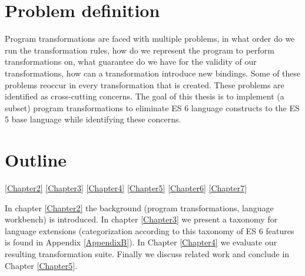 \section{Problem definition}
Program transformations are faced with multiple problems, in what order do we run the transformation rules, how do we represent the program to perform transformations on, what guarantee do we have for the validity of our transformations, how can a transformation introduce new bindings.
Some of these problems reoccur in every transformation that is created. These problems are identified as cross-cutting concerns. The goal of this thesis is to implement (a subset) program transformations to eliminate ES 6 language constructs to the ES 5 base language while identifying these concerns.

\section{Outline}
\ref{Chapter2}
\ref{Chapter3}
\ref{Chapter4}
\ref{Chapter5}
\ref{Chapter6}
\ref{Chapter7}

In chapter \ref{Chapter2} the background (program transformations, language workbench) is introduced. In chapter \ref{Chapter3} we present a taxonomy for language extensions (categorization according to this taxonomy of ES 6 features is found in Appendix \ref{AppendixB}). In Chapter \ref{Chapter4} we evaluate our resulting transformation suite. Finally we discuss related work and conclude in Chapter \ref{Chapter5}.
